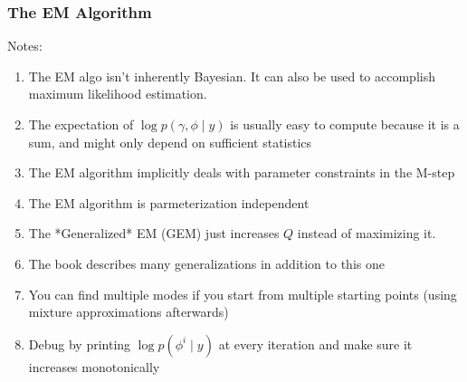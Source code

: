 \documentclass{beamer}
\begin{document}
\begin{frame}[fragile]
\frametitle{The EM Algorithm}

Notes:
\begin{enumerate}
\item The EM algo isn't inherently Bayesian. It can also be used to accomplish maximum likelihood estimation.
\item The expectation of $\log p(\gamma, \phi \mid y)$ is usually easy to compute because it is a sum, and might only depend on sufficient statistics
\item The EM algorithm implicitly deals with parameter constraints in the M-step
\item The EM algorithm is parmeterization independent
\item The *Generalized* EM (GEM) just increases $Q$ instead of maximizing it.
\item The book describes many generalizations in addition to this one
\item You can find multiple modes if you start from multiple starting points (using mixture approximations afterwards)
\item Debug by printing $\log p(\phi^i \mid y)$ at every iteration and make sure it increases monotonically
\end{enumerate}

\end{frame}
\end{document}
